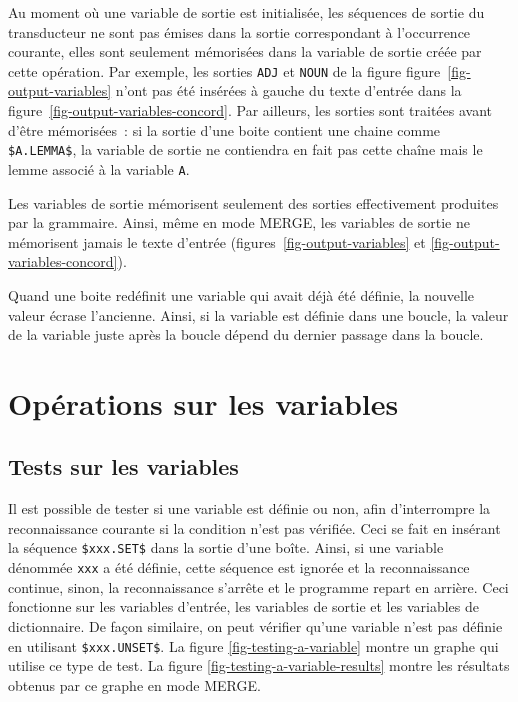 \bigskip
\noindent Au moment où une variable de sortie est initialisée,
les séquences de sortie du transducteur ne sont pas émises dans la sortie correspondant à l'occurrence courante,
elles sont seulement mémorisées dans la variable de sortie créée par cette opération.
Par exemple, les sorties \verb+ADJ+ et \verb+NOUN+ de la figure figure~\ref{fig-output-variables}
n'ont pas été insérées à gauche du texte d'entrée
dans la figure~\ref{fig-output-variables-concord}.
Par ailleurs, les sorties sont traitées avant d'être mémorisées~: si la sortie d'une boite contient une chaine comme 
\verb+$A.LEMMA$+, la variable de sortie ne contiendra en fait pas cette chaîne mais le lemme associé à
la variable \verb+A+.

\bigskip
\noindent Les variables de sortie mémorisent seulement des sorties
effectivement produites par la grammaire. Ainsi, même en mode MERGE, les
variables de sortie ne mémorisent jamais le texte d'entrée
(figures~\ref{fig-output-variables} et \ref{fig-output-variables-concord}).

\bigskip
\noindent Quand une boite redéfinit une variable qui avait déjà été définie,
 la nouvelle valeur écrase l'ancienne.
Ainsi, si la variable est définie dans une boucle, la valeur de la variable juste après
la boucle dépend du dernier passage dans la boucle.


\section{Opérations sur les variables}
\label{section-ops-on-variables}
\subsection{Tests sur les variables}

\noindent Il est possible de tester si une variable est définie ou non, afin d'interrompre la
reconnaissance courante si la condition n'est pas vérifiée. Ceci se fait en insérant la  séquence
\verb+$xxx.SET$+ dans la sortie d'une boîte. Ainsi, si une variable dénommée \verb+xxx+ a été définie,
cette séquence est ignorée et la reconnaissance continue, sinon, la reconnaissance s'arrête
et le programme repart en arrière. Ceci fonctionne sur les variables d'entrée, les variables de
sortie et les variables de dictionnaire. De façon similaire, on peut vérifier qu'une variable n'est
pas définie en utilisant \verb+$xxx.UNSET$+. La figure \ref{fig-testing-a-variable} montre un graphe
qui utilise ce type de test. La figure \ref{fig-testing-a-variable-results} montre les résultats obtenus par ce graphe en mode MERGE.

